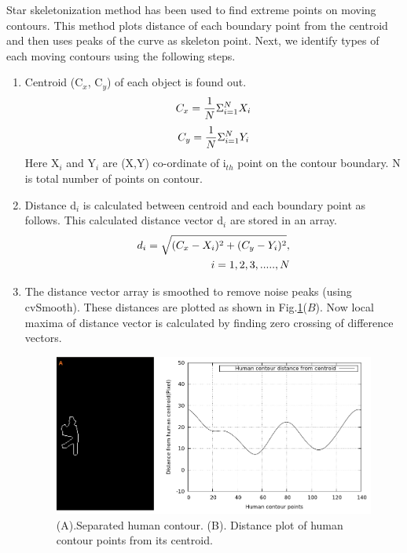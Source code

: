 \documentclass[conference]{IEEEtran}
\begin{document}
\indent Star skeletonization method has been used to find extreme points
on moving contours. This method plots distance of each boundary point
from the centroid and then uses peaks of the curve as skeleton point.
Next, we identify types of each moving contours using the following
steps.\\
\begin{enumerate}
\item Centroid (C$_x$, C$_y$) of each object is found out.\\
	\begin{equation}
	C_x = {1 \over N} \Sigma ^N _{i = 1} X_i 
	\end{equation}
	\begin{equation}
	C_y = {1 \over N} \Sigma ^N _{i = 1} Y_i 
	\end{equation}
Here X$_i$ and Y$_i$ are (X,Y) co-ordinate of i$_{th}$ point on the contour
boundary. N is total number of points on contour.
\item Distance d$_i$ is calculated between centroid and each boundary
point as follows. This calculated distance vector d$_i$ are stored in an
array.
	\begin{equation}
	\begin{split}
	d_i = \sqrt{(C_x - X_i)^2 + (C_y - Y_i)^2}, \\
	\hspace{10 mm} i = 1,2,3,.....,N
	\end{split}
	\end{equation}

\item The distance vector array is smoothed to remove noise peaks (using
cvSmooth). These distances are plotted  as shown in Fig.\ref{distance}($B$).
Now local maxima of distance vector is calculated
by finding zero crossing of difference vectors.\\
\begin{figure}[!h]
\centering
\includegraphics[scale=0.35]{figures/distance}
\caption{(A).Separated human contour. (B). Distance plot of human contour
points from its centroid.}
\label{distance}
\end{figure}



\end{enumerate}
\end{document}
